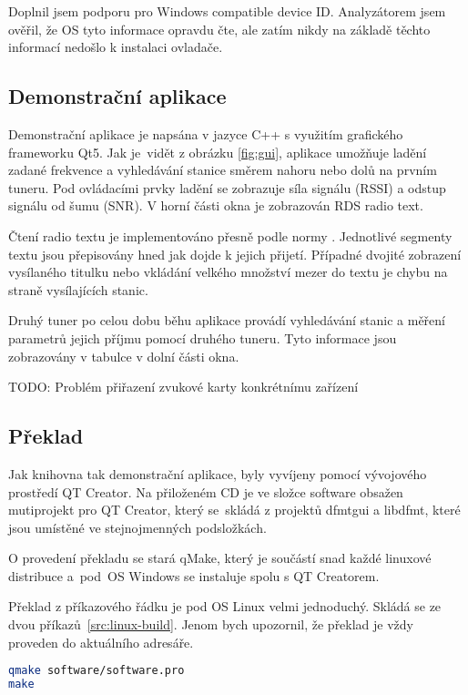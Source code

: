 Doplnil jsem podporu pro Windows compatible device ID. Analyzátorem jsem ověřil, že OS tyto informace opravdu čte, ale zatím nikdy na základě těchto informací nedošlo k instalaci ovladače.

\subsection{Demonstrační aplikace}


Demonstrační aplikace je napsána v jazyce C++ s využitím grafického frameworku Qt5. Jak je~vidět z obrázku \ref{fig:gui}, aplikace umožňuje ladění zadané frekvence a vyhledávání stanice směrem nahoru nebo dolů na prvním tuneru. Pod ovládacími prvky ladění se zobrazuje síla signálu (RSSI) a odstup signálu od šumu (SNR). V horní části okna je zobrazován RDS radio text. 

Čtení radio textu je implementováno přesně podle normy \cite{rds}. Jednotlivé segmenty textu jsou přepisovány hned jak dojde k jejich přijetí. Případné dvojité zobrazení vysílaného titulku nebo vkládání velkého množství mezer do textu je chybu na straně vysílajících stanic.

Druhý tuner po celou dobu běhu aplikace provádí vyhledávání stanic a měření parametrů jejich příjmu pomocí druhého tuneru. Tyto informace jsou zobrazovány v tabulce v dolní části okna.

TODO: Problém přiřazení zvukové karty konkrétnímu zařízení

\subsection{Překlad}
Jak knihovna tak demonstrační aplikace, byly vyvíjeny pomocí vývojového prostředí QT Creator. Na přiloženém CD je ve složce software obsažen mutiprojekt pro QT Creator, který se~skládá z projektů dfmtgui a libdfmt, které jsou umístěné ve stejnojmenných podsložkách.

O provedení překladu se stará qMake, který je součástí snad každé linuxové distribuce a~pod~OS Windows se instaluje spolu s QT Creatorem.

Překlad z příkazového řádku je pod OS Linux velmi jednoduchý. Skládá se ze dvou příkazů~\ref{src:linux-build}. Jenom bych upozornil, že překlad je vždy proveden do aktuálního adresáře.

\begin{lstlisting}[language=bash, label=src:linux-build, caption=Překlad pod OS Linux z příkazové řádku.]
qmake software/software.pro
make
\end{lstlisting}

